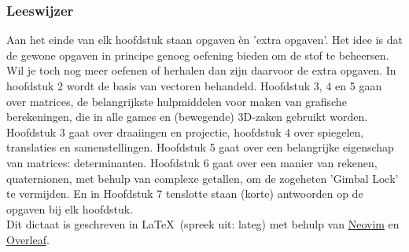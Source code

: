 \subsubsection{Leeswijzer}
Aan het einde van elk hoofdstuk staan opgaven èn 'extra opgaven'. Het idee is dat de gewone opgaven in principe genoeg oefening bieden om de stof te beheersen. Wil je toch nog meer oefenen of herhalen dan zijn daarvoor de extra opgaven. In hoofdstuk 2 wordt de basis van vectoren behandeld. Hoofdstuk 3, 4 en 5 gaan over matrices, de belangrijkste hulpmiddelen voor maken van grafische berekeningen, die in alle games en (bewegende) 3D-zaken gebruikt worden. Hoofdstuk 3 gaat over draaiingen en projectie, hoofdstuk 4 over spiegelen, translaties en samenstellingen. Hoofdstuk 5 gaat over een belangrijke eigenschap van matrices: determinanten. Hoofdstuk 6 gaat over een manier van rekenen, quaternionen, met behulp van complexe getallen, om de zogeheten 'Gimbal Lock' te vermijden. En in Hoofdstuk 7 tenslotte staan (korte) antwoorden op de opgaven bij elk hoofdstuk. \\

Dit dictaat is geschreven in \LaTeX\ (spreek uit: lateg) met behulp van \href{https://neovim.io/}{Neovim} en \href{https://www.overleaf.com}{Overleaf}. 

